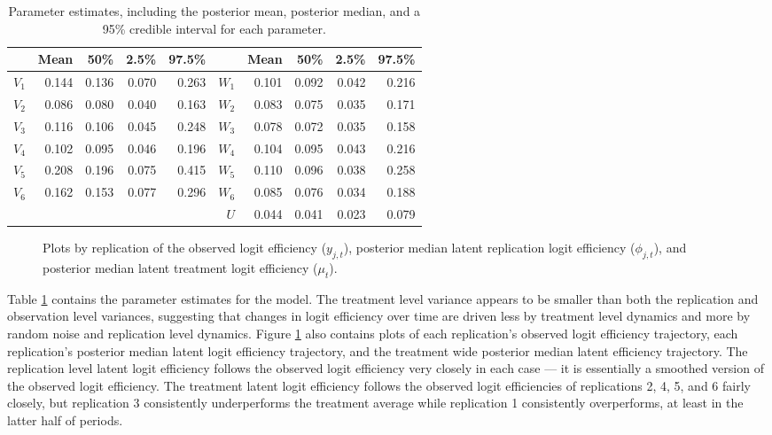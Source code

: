 \documentclass[graybox]{svmult}
\begin{document}
\begin{table}[ht]
\centering
\begin{tabular}{rrrrr|rrrrr}
  \hline
 & Mean & 50\% & 2.5\% & 97.5\% && Mean & 50\% & 2.5\% & 97.5\% \\  
  \hline
  $V_1$ & 0.144 & 0.136 & 0.070 & 0.263 & $W_1$ & 0.101 & 0.092 & 0.042 & 0.216 \\ 
  $V_2$ & 0.086 & 0.080 & 0.040 & 0.163 & $W_2$ & 0.083 & 0.075 & 0.035 & 0.171 \\ 
  $V_3$ & 0.116 & 0.106 & 0.045 & 0.248 & $W_3$ & 0.078 & 0.072 & 0.035 & 0.158 \\ 
  $V_4$ & 0.102 & 0.095 & 0.046 & 0.196 & $W_4$ & 0.104 & 0.095 & 0.043 & 0.216 \\  
  $V_5$ & 0.208 & 0.196 & 0.075 & 0.415 & $W_5$ & 0.110 & 0.096 & 0.038 & 0.258 \\ 
  $V_6$ & 0.162 & 0.153 & 0.077 & 0.296 & $W_6$ & 0.085 & 0.076 & 0.034 & 0.188 \\ 
  &&&&& $U$ & 0.044 & 0.041 & 0.023 & 0.079 \\  
   \hline
\end{tabular}
\caption{Parameter estimates, including the posterior mean, posterior median, and a 95\% credible interval for each parameter.}
\label{tab:parests}
\end{table}

\begin{figure}[h]
\begin{center}
\end{center}
\caption{Plots by replication of the observed logit efficiency ($y_{j,t}$), posterior median latent replication logit efficiency ($\phi_{j,t}$), and posterior median latent treatment logit efficiency ($\mu_t$).}
\label{fig:phiplot}
\end{figure}

Table \ref{tab:parests} contains the parameter estimates for the model. The treatment level variance appears to be smaller than both the replication and observation level variances, suggesting that changes in logit efficiency over time are driven less by treatment level dynamics and more by random noise and replication level dynamics. Figure \ref{fig:phiplot} also contains plots of each replication's observed logit efficiency trajectory, each replication's posterior median latent logit efficiency trajectory, and the treatment wide posterior median latent efficiency trajectory. The replication level latent logit efficiency follows the observed logit efficiency very closely in each case --- it is essentially a smoothed version of the observed logit efficiency. The treatment latent logit efficiency follows the observed logit efficiencies of replications 2, 4, 5, and 6 fairly closely, but replication 3 consistently underperforms the treatment average while replication 1 consistently overperforms, at least in the latter half of periods.
\end{document}
